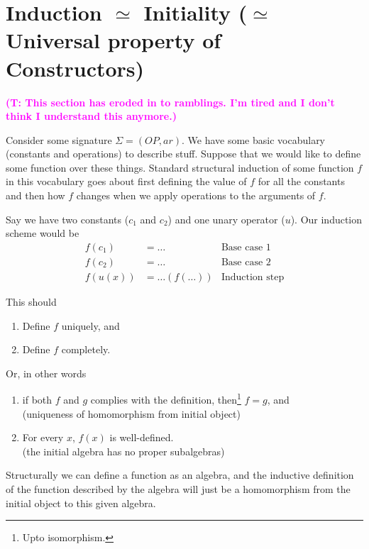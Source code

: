 \documentclass{amsart}
\theoremstyle{definition}
\newcommand{\truls}[1]{\textbf{\textcolor{magenta}{(T: #1)}}}
\begin{document}
\section{Induction $\simeq$ Initiality ($\simeq$ Universal property of Constructors)}
\truls{This section has eroded in to ramblings. I'm tired and I don't think I understand this anymore.}

Consider some signature $\Sigma = (OP, ar)$. We have some basic vocabulary (constants and operations) to describe stuff. Suppose that we would like to define some function over these things. Standard structural induction of some function $f$ in this vocabulary goes about first defining the value of $f$ for all the constants and then how $f$ changes when we apply operations to the arguments of $f$.

Say we have two constants ($c_1$ and $c_2$) and one unary operator ($u$). Our induction scheme would be 
\begin{align*}
f(c_1) &= \dots & \text{Base case 1} \\
f(c_2) &= \dots & \text{Base case 2} \\
f(u(x)) &= \dots(f(\dots)) & \text{Induction step}
\end{align*}

This should 
\begin{enumerate}
\item Define $f$ uniquely, and
\item Define $f$ completely.
\end{enumerate}

Or, in other words
\begin{enumerate}
\item if both $f$ and $g$ complies with the definition, then\footnote{Upto isomorphism.} $f = g$, and \\
(uniqueness of homomorphism from initial object)
\item For every $x$, $f(x)$ is well-defined.\\
(the initial algebra has no proper subalgebras)
\end{enumerate}

Structurally we can define a function as an algebra, and the inductive definition of the function described by the algebra will just be a homomorphism from the initial object to this given algebra. 
\end{document}
